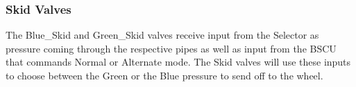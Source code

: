 \subsubsection{Skid Valves}
The Blue\_Skid and Green\_Skid valves receive input from the Selector as pressure coming through the respective pipes as well as input from the BSCU that commands Normal or Alternate mode. The Skid valves will use these inputs to choose between the Green or the Blue pressure to send off to the wheel. 



